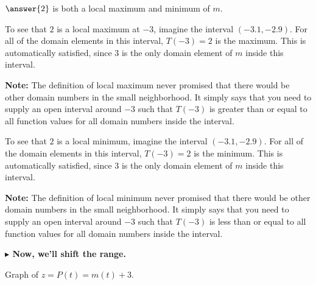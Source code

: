 \documentclass{ximera}
\begin{document}
\begin{example}
\begin{itemize}
\end{itemize}


$\answer{2}$ is both a local maximum and minimum of $m$.  

To see that $2$ is a local maximum at $-3$, imagine the interval $(-3.1, -2.9)$. For all of the domain elements in this interval, $T(-3)=2$ is the maximum.  This is automatically satisfied, since $3$ is the only domain element of $m$ inside this interval.  

\textbf{Note:} The definition of local maximum never promised that there would be other domain numbers in the small neighborhood.  It simply says that you need to supply an open interval around $-3$ such that $T(-3)$ is greater than or equal to all function values for all domain numbers inside the interval. 

To see that $2$ is a local minimum, imagine the interval $(-3.1, -2.9)$. For all of the domain elements in this interval, $T(-3)=2$ is the minimum.  This is automatically satisfied, since $3$ is the only domain element of $m$ inside this interval.  


\textbf{Note:} The definition of local minimum never promised that there would be other domain numbers in the small neighborhood.  It simply says that you need to supply an open interval around $-3$ such that $T(-3)$ is less than or equal to all function values for all domain numbers inside the interval. 




\textbf{\textcolor{blue!55!black}{$\blacktriangleright$ Now, we'll shift the range.}} 



Graph of $z = P(t) = m(t)+3$.

\begin{image}
\end{image}
\end{example}
\end{document}
